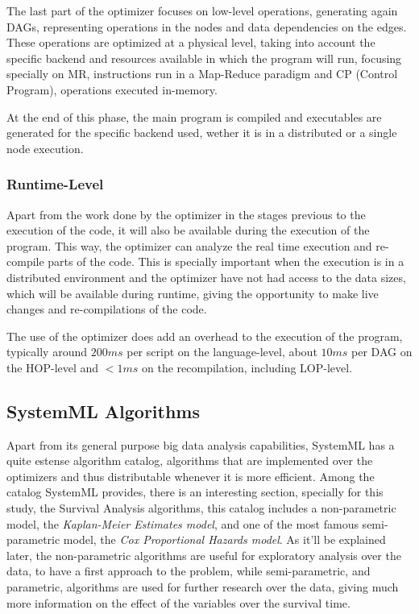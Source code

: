 \documentclass[11pt]{book} %
\begin{document}
        The last part of the optimizer focuses on low-level operations, generating again DAGs, representing operations in the nodes and data dependencies on the edges. These operations are optimized at a physical level, taking into account the specific backend and resources available in which the program will run, focusing specially on MR, instructions run in a Map-Reduce paradigm and CP (Control Program), operations executed in-memory.

        At the end of this phase, the main program is compiled and executables are generated for the specific backend used, wether it is in a distributed or a single node execution.

      \subsubsection{Runtime-Level}

        Apart from the work done by the optimizer in the stages previous to the execution of the code, it will also be available during the execution of the program. This way, the optimizer can analyze the real time execution and re-compile parts of the code. This is specially important when the execution is in a distributed environment and the optimizer have not had access to the data sizes, which will be available during runtime, giving the opportunity to make live changes and re-compilations of the code.

      The use of the optimizer does add an overhead to the execution of the program, typically around $200ms$ per script on the language-level, about $10ms$ per DAG on the HOP-level and $<1ms$ on the recompilation, including LOP-level.

    \subsection{SystemML Algorithms}

      Apart from its general purpose big data analysis capabilities, SystemML has a quite estense algorithm catalog, algorithms that are implemented over the optimizers and thus distributable whenever it is more efficient. Among the catalog SystemML provides, there is an interesting section, specially for this study, the Survival Analysis algorithms, this catalog includes a non-parametric model, the \emph{Kaplan-Meier Estimates model}, and one of the most famous semi-parametric model, the \emph{Cox Proportional Hazards model}. As it'll be explained later, the non-parametric algorithms are useful for exploratory analysis over the data, to have a first approach to the problem, while semi-parametric, and parametric, algorithms are used for further research over the data, giving much more information on the effect of the variables over the survival time.
\end{document}
